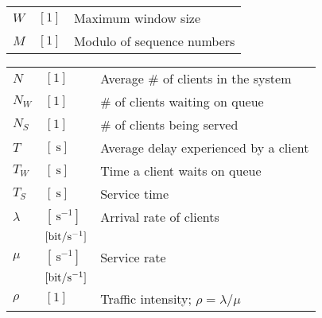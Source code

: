\documentclass{form}
\begin{document}
\begin{center}
\begin{minipage}{0.49\textwidth}
\begin{tabular}{l l | p{59mm}}
            $W$           & $[1                       ]$ & Maximum window size                                         \\
            $M$           & $[1                       ]$ & Modulo of sequence numbers                                  \\
        \end{tabular}
    \end{minipage}
    \begin{minipage}{0.49\textwidth}
        \begin{tabular}{l l | p{59mm}}
            $N$           & $[1                       ]$ & Average \# of clients in the system                         \\
            $N_W$         & $[1                       ]$ & \# of clients waiting on queue                              \\
            $N_S$         & $[1                       ]$ & \# of clients being served                                  \\
            $T$           & $[\SI{}{\second}          ]$ & Average delay experienced by a client                       \\
            $T_W$         & $[\SI{}{\second}          ]$ & Time a client waits on queue                                \\
            $T_S$         & $[\SI{}{\second}          ]$ & Service time                                                \\
            $\lambda$     & $[\SI{}{     \second^{-1}}]$ & Arrival rate of clients                                     \\
                          & $[\SI{}{\bit/\second^{-1}}]$ &                                                             \\
            $\mu$         & $[\SI{}{     \second^{-1}}]$ & Service rate                                                \\
                          & $[\SI{}{\bit/\second^{-1}}]$ &                                                             \\
            $\rho$        & $[1                       ]$ & Traffic intensity; $\rho = \lambda/\mu$                     \\
        \end{tabular}
    \end{minipage}
\end{center}
\end{document}
